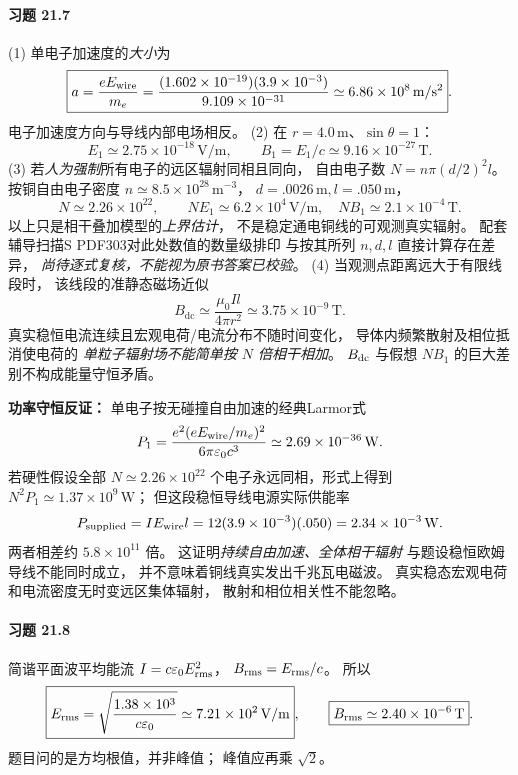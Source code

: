 \paragraph{习题 21.7}
(1) 单电子加速度的\emph{大小}为
\[
\boxed{a=\frac{eE_{\rm wire}}{m_e}
=\frac{(1.602\times10^{-19})(3.9\times10^{-3})}
{9.109\times10^{-31}}
\simeq6.86\times10^8\,\mathrm{m/s^2}}.
\]
电子加速度方向与导线内部电场相反。
(2) 在 \(r=4.0\,\mathrm m\)、\(\sin\theta=1\)：
\[
\boxed{E_{1}\simeq2.75\times10^{-18}\,\mathrm{V/m}},
\qquad
\boxed{B_{1}=E_1/c\simeq9.16\times10^{-27}\,\mathrm T}.
\]
(3) 若\emph{人为强制}所有电子的远区辐射同相且同向，
自由电子数
\(N=n\pi(d/2)^2l\)。
按铜自由电子密度
\(n\simeq8.5\times10^{28}\,\mathrm{m^{-3}}\)，
\(d=.0026\,\mathrm m,l=.050\,\mathrm m\)，
\[
N\simeq2.26\times10^{22},\qquad
\boxed{NE_1\simeq6.2\times10^4\,\mathrm{V/m}},
\quad
\boxed{NB_1\simeq2.1\times10^{-4}\,\mathrm T}.
\]
以上只是相干叠加模型的\emph{上界估计}，
不是稳定通电铜线的可观测真实辐射。
配套辅导扫描S PDF303对此处数值的数量级排印
与按其所列 \(n,d,l\) 直接计算存在差异，
\emph{尚待逐式复核，不能视为原书答案已校验}。
(4) 当观测点距离远大于有限线段时，
该线段的准静态磁场近似
\[
\boxed{B_{\mathrm{dc}}\simeq
\frac{\mu_0Il}{4\pi r^2}
\simeq3.75\times10^{-9}\,\mathrm T}.
\]
真实稳恒电流连续且宏观电荷/电流分布不随时间变化，
导体内频繁散射及相位抵消使电荷的
\emph{单粒子辐射场不能简单按 \(N\) 倍相干相加}。
\(B_{\rm dc}\) 与假想 \(NB_1\) 的巨大差别不构成能量守恒矛盾。

\textbf{功率守恒反证：}
单电子按无碰撞自由加速的经典Larmor式
\[
 P_1=\frac{e^2(eE_{\rm wire}/m_e)^2}
 {6\pi\varepsilon_0c^3}
 \simeq2.69\times10^{-36}\,\mathrm W.
\]
若硬性假设全部 \(N\simeq2.26\times10^{22}\)
个电子永远同相，形式上得到
\(N^2P_1\simeq1.37\times10^9\,\mathrm W\)；
但这段稳恒导线电源实际供能率
\[
 P_{\rm supplied}=IE_{\rm wire}l
 =12(3.9\times10^{-3})(.050)
 =2.34\times10^{-3}\,\mathrm W.
\]
两者相差约 \(5.8\times10^{11}\) 倍。
这证明\emph{持续自由加速、全体相干辐射}
与题设稳恒欧姆导线不能同时成立，
并不意味着铜线真实发出千兆瓦电磁波。
真实稳态宏观电荷和电流密度无时变远区集体辐射，
散射和相位相关性不能忽略。


\paragraph{习题 21.8}
简谐平面波平均能流
\(I=c\varepsilon_0E_{\rm rms}^2\)，
\(B_{\rm rms}=E_{\rm rms}/c\)。
所以
\[
\boxed{E_{\rm rms}=
\sqrt{\frac{1.38\times10^3}{c\varepsilon_0}}
\simeq7.21\times10^2\,\mathrm{V/m}},\qquad
\boxed{B_{\rm rms}\simeq2.40\times10^{-6}\,\mathrm T}.
\]
题目问的是方均根值，并非峰值；
峰值应再乘 \(\sqrt2\)。

